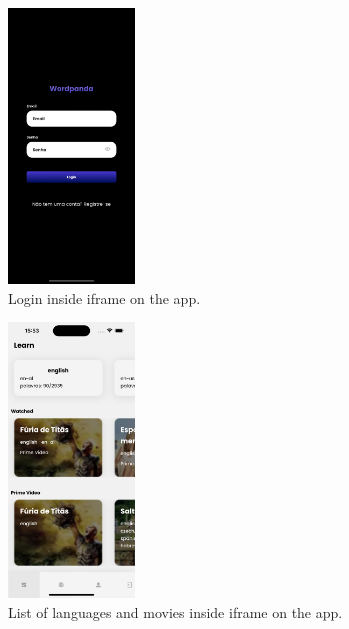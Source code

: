 \documentclass[12pt]{article}
\begin{document}
  \begin{figure}[h]
    \centering
    \caption{
    Login inside iframe on the app.
    }
    \label{fig:app1}
    \includegraphics[width=0.3\textwidth]{assets/14.png}
  \end{figure}

  \begin{figure}[h]
    \centering
    \caption{
     List of languages and movies inside iframe on the app.
    }
    \label{fig:app2}
    \includegraphics[width=0.3\textwidth]{assets/15.png}
  \end{figure}
\end{document}
